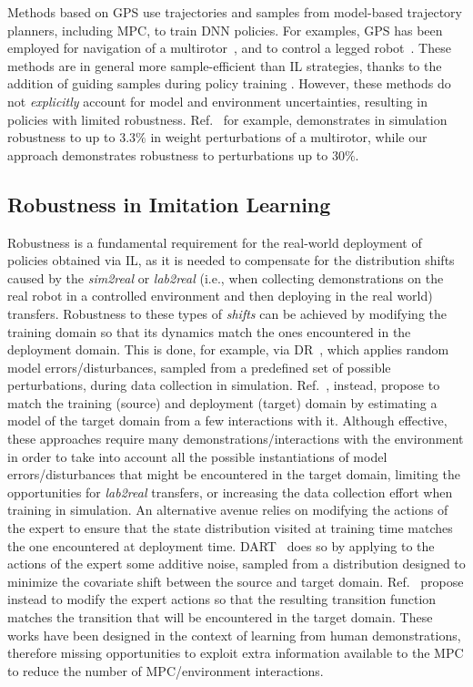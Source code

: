 Methods based on \ac{GPS} \cite{levine2013guided} use trajectories and samples from model-based trajectory planners, including \ac{MPC}, to train \ac{DNN} policies. For examples, \ac{GPS} has been employed for navigation of a multirotor~\cite{zhang2016learning, kahn2017plato}, and to control a legged robot~\cite{carius2020mpc, reske2021imitation}. These methods are in general more sample-efficient than \ac{IL} strategies, thanks to the addition of guiding samples during policy training \cite{levine2013guided}. However, these methods do not \textit{explicitly} account for model and environment uncertainties, resulting in policies with limited robustness. Ref.~\cite{zhang2016learning} for example, demonstrates in simulation robustness to up to $3.3\%$ in weight perturbations of a multirotor, while our approach demonstrates robustness to perturbations up to $30\%$.


\noindent
\subsection{Robustness in Imitation Learning}
Robustness is a fundamental requirement for the real-world deployment of policies obtained via \ac{IL}, as it is needed to compensate for the distribution shifts caused by the \textit{sim2real} or \textit{lab2real} (i.e., when collecting demonstrations on the real robot in a controlled environment and then deploying in the real world) transfers. Robustness to these types of \textit{shifts} can be achieved by modifying the training domain so that its dynamics match the ones encountered in the deployment domain. This is done, for example, via \ac{DR}~\cite{peng2018sim}, which applies random model errors/disturbances, sampled from a predefined set of possible perturbations, during data collection in simulation. Ref.~\cite{farchy2013humanoid, chebotar2019closing}, instead, propose to match the training (source) and deployment (target) domain by estimating a model of the target domain from a few interactions with it. Although effective, these approaches require many demonstrations/interactions with the environment in order to take into account all the possible instantiations of model errors/disturbances that might be encountered in the target domain, limiting the opportunities for \textit{lab2real} transfers, or increasing the data collection effort when training in simulation. 
An alternative avenue relies on modifying the actions of the expert to ensure that the state distribution visited at training time matches the one encountered at deployment time. DART~\cite{laskey2017dart} does so by applying to the actions of the expert some additive noise, sampled from a distribution designed to minimize the covariate shift between the source and target domain. Ref.~\cite{hanna2017grounded, desai2020imitation} propose instead to modify the expert actions so that the resulting transition function matches the transition that will be encountered in the target domain. These works have been designed in the context of learning from human demonstrations, therefore missing opportunities to exploit extra information available to the \ac{MPC} to reduce the number of \ac{MPC}/environment interactions.


